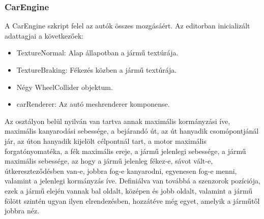 \subsubsection{CarEngine}
A CarEngine szkript felel az autók összes mozgásáért. Az editorban inicializált adattagjai a következőek:
\begin{itemize}
\item{TextureNormal: Alap állapotban a jármű textúrája.}
\item{TextureBraking: Fékezés közben a jármű textúrája.}
\item{Négy WheelCollider objektum.}
\item{carRenderer: Az autó meshrenderer komponense.}
\end{itemize}
Az osztályon belül nyilván van tartva annak maximális kormányzási íve, maximális kanyarodási sebessége, a bejárandó út, az út hanyadik csomópontjánál jár, az úton hanyadik kijelölt célpontnál tart, a motor maximális forgatónyomatéka, a fék maximális ereje, a jármű jelenlegi sebessége, a jármű maximális sebessége, az hogy a jármű jelenleg fékez-e, sávot vált-e, útkereszteződésben van-e, jobbra fog-e kanyarodni, egyenesen fog-e menni, valamint a jelenlegi kormányzás íve.
Definiálva van továbbá a szenzorok pozíciója, ezek a jármű elején vannak bal oldalt, középen és jobb oldalt, valamint a jármű fölött szintén ugyan ilyen elrendezésben, hozzátéve még egyet, amelyik a járműtől jobbra néz.

